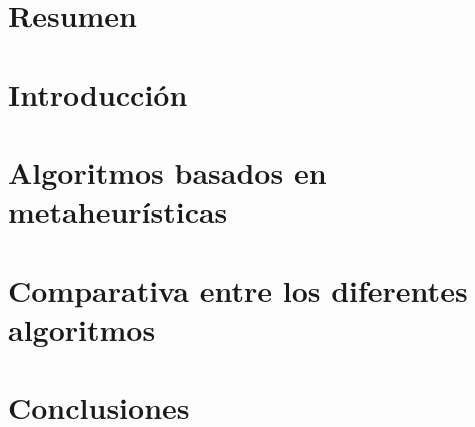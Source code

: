 \documentclass[a4paper,10pt,twoside]{report}
\author{\me}
\begin{document}


\normalsize

\chapter*{Resumen}\label{chapter:Resumen}
\setcounter{page}{0}


\tableofcontents

\chapter{Introducción}\label{chapter:Introduccion}


\chapter{Algoritmos basados en metaheurísticas}\label{chapter:Algoritmos}


\chapter{Comparativa entre los diferentes algoritmos}\label{chapter:Comparativa}


\chapter{Conclusiones}\label{chapter:Conclusiones}


\renewcommand{\bibname}{Bibliografia}


\end{document}
